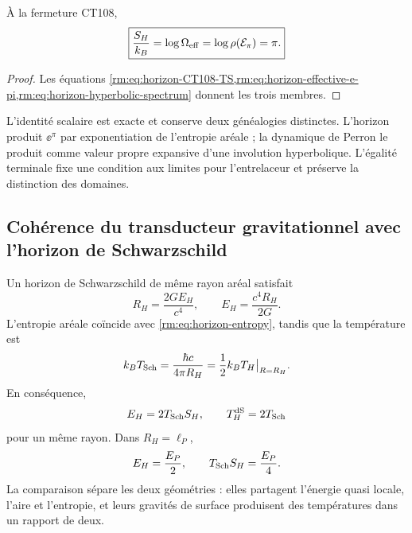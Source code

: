 \begin{corollary}
\label{rm:cor:horizon-Perron-scalar}
À la fermeture CT108,
\begin{equation}
 \boxed{
 \frac{S_H}{k_B}
 =\log\Omega_{\rm eff}
 =\log\rho(\mathcal E_\pi)
 =\pi.}
 \label{rm:eq:horizon-Perron-log}
\end{equation}
\end{corollary}

\begin{proof}
Les équations \cref{rm:eq:horizon-CT108-TS,rm:eq:horizon-effective-e-pi,rm:eq:horizon-hyperbolic-spectrum} donnent les trois membres.
\end{proof}

L’identité scalaire est exacte et conserve deux généalogies distinctes. L’horizon produit \(\ee^\pi\) par exponentiation de l’entropie aréale ; la dynamique de Perron le produit comme valeur propre expansive d’une involution hyperbolique. L’égalité terminale fixe une condition aux limites pour l’entrelaceur et préserve la distinction des domaines.

\subsection{Cohérence du transducteur gravitationnel avec l’horizon de Schwarzschild}

Un horizon de Schwarzschild de même rayon aréal satisfait
\begin{equation}
 R_H=\frac{2GE_H}{c^4},
 \qquad
 E_H=\frac{c^4R_H}{2G}.
 \label{rm:eq:horizon-Schwarzschild-energy}
\end{equation}
L’entropie aréale coïncide avec \cref{rm:eq:horizon-entropy}, tandis que la température est
\begin{equation}
 k_BT_{\rm Sch}=\frac{\hbar c}{4\pi R_H}
 =\frac12k_BT_H\big|_{R=R_H}.
 \label{rm:eq:horizon-Schwarzschild-temperature}
\end{equation}
En conséquence,
\begin{equation}
 E_H=2T_{\rm Sch}S_H,
 \qquad
 T_H^{\rm dS}=2T_{\rm Sch}
 \label{rm:eq:horizon-Schwarzschild-Smarr}
\end{equation}
pour un même rayon. Dans \(R_H=\ell_P\),
\begin{equation}
 E_H=\frac{E_P}{2},
 \qquad
 T_{\rm Sch}S_H=\frac{E_P}{4}.
 \label{rm:eq:horizon-Schwarzschild-Planck}
\end{equation}
La comparaison sépare les deux géométries : elles partagent l’énergie quasi locale, l’aire et l’entropie, et leurs gravités de surface produisent des températures dans un rapport de deux.

